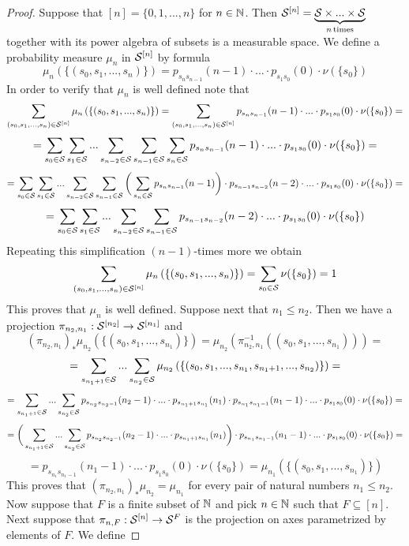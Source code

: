 \begin{proof}
Suppose that $[n] = \{0,1,...,n\}$ for $n\in {\mathbb N}$. Then ${\mathcal S}^{[n]} = \underbrace{{\mathcal S}\times ...\times {\mathcal S}}_{n\,\mathrm{times}}$ together with its power algebra of subsets is a measurable space. We define a probability measure $\mu_n$ in ${\mathcal S}^{[n]}$ by formula
$$\mu_n\left(\{(s_0,s_1,...,s_n)\}\right) = p_{s_{n}s_{n-1}}(n-1)\cdot ... \cdot p_{s_{1}s_{0}}(0)\cdot \nu(\{s_0\})$$
In order to verify that $\mu_n$ is well defined note that
$$\sum_{(s_0,s_1,...,s_n)\in {\mathcal S}^{[n]}}\mu_n\left(\{(s_0,s_1,...,s_n)\}\right) = \sum_{(s_0,s_1,...,s_n)\in {\mathcal S}^{[n]}}p_{s_{n}s_{n-1}}(n-1)\cdot ... \cdot p_{s_{1}s_{0}}(0)\cdot \nu(\{s_0\}) = $$
$$=\sum_{s_0\in {\mathcal S}}\sum_{s_1\in {\mathcal S}}...\sum_{s_{n-2}\in {\mathcal S}}\sum_{s_{n-1}\in {\mathcal S}}\sum_{s_n\in {\mathcal S}}p_{s_{n}s_{n-1}}(n-1)\cdot ... \cdot p_{s_{1}s_{0}}(0)\cdot \nu(\{s_0\}) =$$
$$= \sum_{s_0\in {\mathcal S}}\sum_{s_1\in {\mathcal S}}...\sum_{s_{n-2}\in {\mathcal S}}\sum_{s_{n-1}\in {\mathcal S}}\bigg(\sum_{s_n\in {\mathcal S}}p_{s_{n}s_{n-1}}(n-1)\bigg)\cdot p_{s_{n-1}s_{n-2}}(n-2)\cdot ... \cdot p_{s_{1}s_{0}}(0)\cdot \nu(\{s_0\})= $$
$$=\sum_{s_0\in {\mathcal S}}\sum_{s_1\in {\mathcal S}}...\sum_{s_{n-2}\in {\mathcal S}}\sum_{s_{n-1}\in {\mathcal S}} p_{s_{n-1}s_{n-2}}(n-2)\cdot ... \cdot p_{s_{1}s_{0}}(0)\cdot \nu(\{s_0\})$$
Repeating this simplification $(n-1)$-times more we obtain
$$\sum_{(s_0,s_1,...,s_n)\in {\mathcal S}^{[n]}}\mu_n\left(\{(s_0,s_1,...,s_n)\}\right) = \sum_{s_0\in {\mathcal S}}\nu(\{s_0\}) = 1$$
This proves that $\mu_n$ is well defined. Suppose next that $n_1\leq n_2$. Then we have a projection $\pi_{n_2,n_1}:{\mathcal S}^{[n_2]}\rightarrow {\mathcal S}^{[n_1]}$ and
$$\left(\pi_{n_2,n_1}\right)_*\mu_{n_2}\left(\{(s_0,s_1,...,s_{n_1})\}\right) = \mu_{n_2}\left(\pi_{n_2,n_1}^{-1}\left((s_0,s_1,...,s_{n_1})\right)\right) = $$
$$=\sum_{s_{n_1+1}\in {\mathcal S}}...\sum_{s_{n_2}\in {\mathcal S}}\mu_{n_2}\left(\{(s_0,s_1,...,s_{n_1},s_{n_1+1},...,s_{n_2})\}\right) =$$
$$= \sum_{s_{n_1+1}\in {\mathcal S}}...\sum_{s_{n_2}\in {\mathcal S}}p_{s_{n_2}s_{n_2-1}}(n_2-1)\cdot ...\cdot p_{s_{n_1 + 1}s_{n_1}}(n_1)\cdot p_{s_{n_1}s_{n_1-1}}(n_1-1) \cdot ...\cdot p_{s_{1}s_{0}}(0)\cdot \nu(\{s_0\})=$$
$$= \bigg(\sum_{s_{n_1+1}\in {\mathcal S}}...\sum_{s_{n_2}\in {\mathcal S}}p_{s_{n_2}s_{n_2-1}}(n_2-1)\cdot ...\cdot p_{s_{n_1 + 1}s_{n_1}}(n_1)\bigg)\cdot p_{s_{n_1}s_{n_1-1}}(n_1-1) \cdot ...\cdot p_{s_{1}s_{0}}(0)\cdot \nu(\{s_0\}) =$$
$$=p_{s_{n_1}s_{n_1-1}}(n_1-1) \cdot ...\cdot p_{s_{1}s_{0}}(0)\cdot \nu(\{s_0\}) = \mu_{n_1}\left(\{(s_0,s_1,...,s_{n_1})\}\right)$$
This proves that $\left(\pi_{n_2,n_1}\right)_*\mu_{n_2} = \mu_{n_1}$ for every pair of natural numbers $n_1\leq n_2$. Now suppose that $F$ is a finite subset of ${\mathbb N}$ and pick $n\in {\mathbb N}$ such that $F\subseteq [n]$. Next suppose that $\pi_{n,F}:{\mathcal S}^{[n]}\rightarrow {\mathcal S}^F$ is the projection on axes parametrized by elements of $F$. We define

\end{proof}
